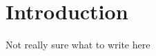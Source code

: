 \chapter{Introduction}
\ifpdf
    \graphicspath{{01_Introduction/plots/}}
\else
    \graphicspath{{01_Introduction/plots/EPS/}{01_Introduction/plots/}}
\fi

Not really sure what to write here



